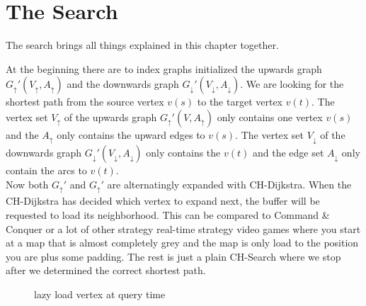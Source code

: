 \section{The Search}

The search brings all things explained in this chapter together. 

At the beginning there are to index graphs initialized the upwards graph $G_\uparrow'(V_\uparrow, A_\uparrow)$ and the downwards graph $G_\downarrow'(V_\downarrow, A_\downarrow)$. We are looking for the shortest
path from the source vertex $v(s)$ to the target vertex $v(t)$. The vertex set $V_\uparrow$ of the upwards graph $G_\uparrow'(V, A_\uparrow)$ only contains one vertex $v(s)$ and the $A_\uparrow$ only contains 
the upward edges to $v(s)$. The vertex set $V_\downarrow$ of the downwards graph $G_\downarrow'(V_\downarrow, A_\downarrow)$ only contains the $v(t)$ and the edge set $A_\downarrow$ only contain the arcs to $v(t)$.
\\
Now both $G_\uparrow'$ and $G_\uparrow'$ are alternatingly expanded with CH-Dijkstra. When the CH-Dijkstra has decided which vertex to expand next, the buffer will be requested to load its neighborhood. This can be 
compared to Command \& Conquer or a lot of other strategy  real-time strategy video games where you start at a map that is almost completely grey and the map is only load to the position you are plus some padding.
The rest is just a plain CH-Search where we stop after we determined the correct shortest path.

\begin{figure}
    \centering
    
    \caption{lazy load vertex at query time}
    \label{fig:circular_buffer}
\end{figure}


%    

